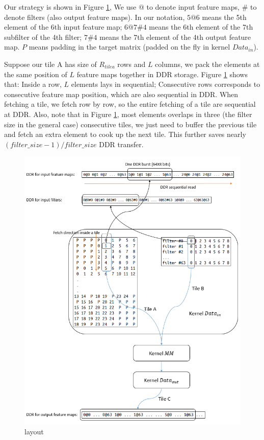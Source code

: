 \documentclass{acm_proc_article-sp-copy}
\begin{document}
Our strategy is shown in Figure \ref{layout}, We use $@$ to denote input feature maps, $\#$ to denote filters (also output feature maps).
In our notation,
$5@6$ means the 5th element of the 6th input feature map;
$6@7\#4$ means the 6th element of the 7th subfilter of the 4th filter;
$7\#4$ means the 7th element of the 4th output feature map.
$P$ means padding in the target matrix (padded on the fly in kernel $Data_{in}$).

Suppose our tile A has size of $R_{tile a}$ rows and $L$ columns, we pack the elements at the same position of $L$ feature maps together in DDR storage.
Figure \ref{layout} shows that: Inside a row, $L$ elements lays in sequential; Consecutive rows corresponds to consecutive feature map position, which are also sequential in DDR.
When fetching a tile, we fetch row by row, so the entire fetching of a tile are sequential at DDR.
Also, note that in Figure \ref{layout}, most elements overlaps in three (the filter size in the general case) consecutive tiles, we just need to buffer the previous tile and fetch an extra element to cook up the next tile.
This further saves nearly $(filter\_size - 1)/filter\_size$ DDR transfer.

\begin{figure}
	\centering
	\includegraphics[width=1.0\linewidth]{./figure/z/layout.png}
	\caption{layout}
	\label{layout}
\end{figure}
\end{document}
